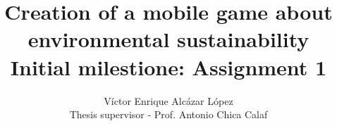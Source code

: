 

\title{Creation of a mobile game about environmental sustainability \\
 \large Initial milestione: Assignment 1}

\author{Víctor Enrique Alcázar López \\
	Thesis supervisor - Prof. Antonio Chica Calaf}




\maketitle
\tableofcontents







\printglossary




